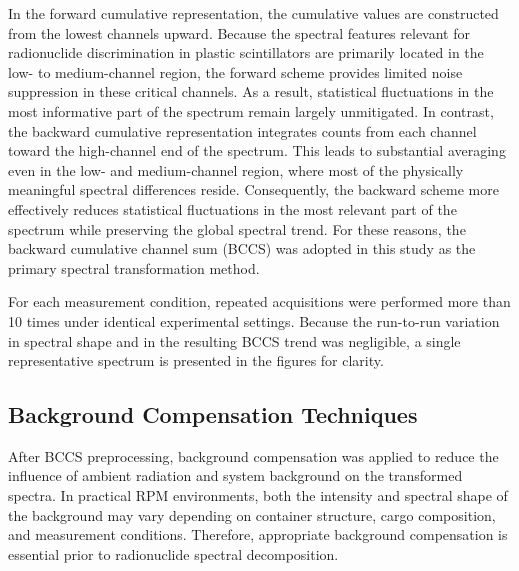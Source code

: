 \documentclass[fleqn, 10pt]{wlscirep}
\begin{document}
In the forward cumulative representation, the cumulative values are constructed from the lowest channels upward. Because the spectral features relevant for radionuclide discrimination in plastic scintillators are primarily located in the low- to medium-channel region, the forward scheme provides limited noise suppression in these critical channels. As a result, statistical fluctuations in the most informative part of the spectrum remain largely unmitigated.
In contrast, the backward cumulative representation integrates counts from each channel toward the high-channel end of the spectrum. This leads to substantial averaging even in the low- and medium-channel region, where most of the physically meaningful spectral differences reside. Consequently, the backward scheme more effectively reduces statistical fluctuations in the most relevant part of the spectrum while preserving the global spectral trend.
For these reasons, the backward cumulative channel sum (BCCS) was adopted in this study as the primary spectral transformation method.


For each measurement condition, repeated acquisitions were performed more than 10 times under identical experimental settings. Because the run-to-run variation in spectral shape and in the resulting BCCS trend was negligible, a single representative spectrum is presented in the figures for clarity.



\subsection*{Background Compensation Techniques}

After BCCS preprocessing, background compensation was applied to reduce the influence of ambient radiation and system background on the transformed spectra. In practical RPM environments, both the intensity and spectral shape of the background may vary depending on container structure, cargo composition, and measurement conditions. Therefore, appropriate background compensation is essential prior to radionuclide spectral decomposition.
\end{document}
